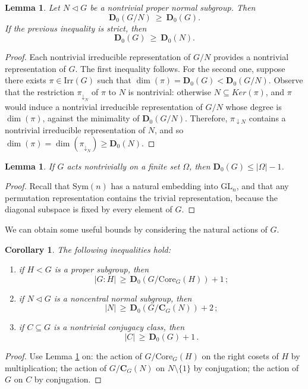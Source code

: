 \documentclass{daj}
\newtheorem{lemma}[theorem]{Lemma}
\newtheorem{corollary}[theorem]{Corollary}
\theoremstyle{definition}
\theoremstyle{remark}
\newcommand{\Sym}{\mathrm{Sym}}
\newcommand{\Irr}{\mathrm{Irr}}
\newcommand{\GL}{\mathrm{GL}}
\newcommand{\C}{\mathbf{C}}
\newcommand{\D}{\mathbf{D}}
\begin{document}
\begin{lemma} \label{lemExt1}
	Let $N \lhd G$ be a nontrivial proper normal subgroup.
	Then
	$$ \D_0(G/N) \> \geq \> \D_0(G) . $$
	If the previous inequality is strict, then
	$$ \D_0(G) \> \geq \> \D_0(N) . $$
\end{lemma}
\begin{proof}
Each nontrivial irreducible representation of $G/N$ provides a nontrivial representation of $G$.
The first inequality follows.
For the second one, suppose there exists $\pi \in \Irr(G)$ such that $\dim(\pi) = \D_0(G) < \D_0(G/N)$. 
Observe that the restriction $\pi_{\downarrow_N}$ of $\pi$ to $N$ is nontrivial: otherwise $N \subseteq Ker(\pi)$,
and $\pi$ would induce a nontrivial irreducible representation of $G/N$ whose degree is $\dim(\pi)$,
against the minimality of $\D_0(G/N)$.
Therefore, $\pi_{\downarrow N}$ contains a nontrivial irreducible representation of $N$,
and so $\dim(\pi) = \dim ( \pi_{\downarrow_N} ) \geq \D_0(N)$.
\end{proof} 

\begin{lemma} \label{lemActions}
If $G$ acts nontrivially on a finite set $\Omega$, then $\D_0(G) \leq |\Omega|-1$.
\end{lemma}
\begin{proof}
Recall that $\Sym(n)$ has a natural embedding into $\GL_n$, and that any permutation representation contains the trivial representation,
because the diagonal subspace is fixed by every element of $G$.
\end{proof}

We can obtain some useful bounds by considering the natural actions of $G$.

\begin{corollary} \label{corActions}
The following inequalities hold:
\begin{enumerate}[$(i)$]
	\item if $H < G$ is a proper subgroup, then
	\[ |G:H| \, \geq \, \D_0(G/\mathrm{Core}_G(H)) +1 \,; \]
	\item if $N \lhd G$ is a noncentral normal subgroup, then
	\[ |N| \, \geq \, \D_0(G/\C_G(N)) +2 \,; \]
	\item if $C \subseteq G$ is a nontrivial conjugacy class, then
	\[ |C| \, \geq \, \D_0(G) +1 \,.\]
\end{enumerate}
\end{corollary} 
\begin{proof}
	Use Lemma \ref{lemActions} on:
	the action of $G/\mathrm{Core}_G(H)$ on the right cosets of $H$ by multiplication;
	the action of $G/\C_G(N)$ on $N \setminus \{1\}$ by conjugation;
	the action of $G$ on $C$ by conjugation.
\end{proof} 
\end{document}
